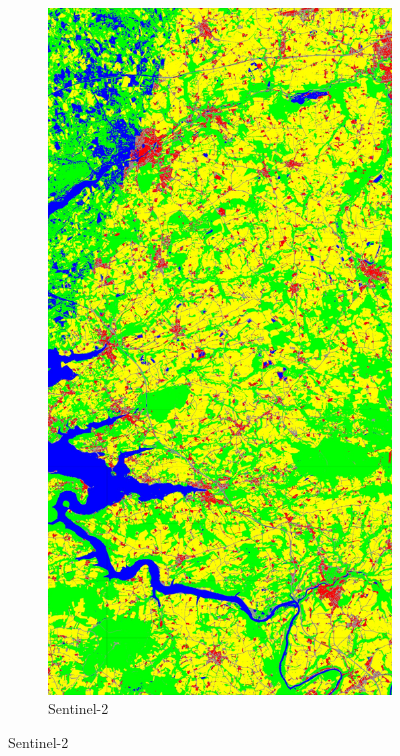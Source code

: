 \documentclass[10pt]{article}
\begin{document}
\begin{appendices}
\begin{figure}[H]
    \centering 
    \begin{subfigure}{0.49\textwidth}
        \centering
        \includegraphics[width=\textwidth]{all_classif_S2}
        \caption{Sentinel-2}

\end{subfigure}
\end{figure}
\end{appendices}
\end{document}
